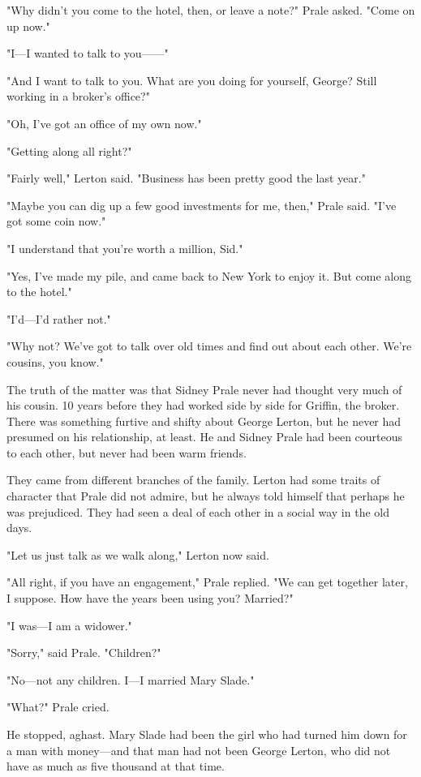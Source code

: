 \documentclass{novel}
\begin{document}
"Why didn't you come to the hotel, then, or leave a note?" Prale asked. "Come on up now."

"I---I wanted to talk to you------"

"And I want to talk to you. What are you doing for yourself, George? Still working in a broker's office?"

"Oh, I've got an office of my own now."

"Getting along all right?"

"Fairly well," Lerton said. "Business has been pretty good the last year."

"Maybe you can dig up a few good investments for me, then," Prale said. "I've got some coin now."

"I understand that you're worth a million, Sid."

"Yes, I've made my pile, and came back to New York to enjoy it. But come along to the hotel."

"I'd---I'd rather not."

"Why not? We've got to talk over old times and find out about each other. We're cousins, you know."

The truth of the matter was that Sidney Prale never had thought very much of his cousin. 10 years before they had worked side by side for Griffin, the broker. There was something furtive and shifty about George Lerton, but he never had presumed on his relationship, at least. He and Sidney Prale had been courteous to each other, but never had been warm friends.

They came from different branches of the family. Lerton had some traits of character that Prale did not admire, but he always told himself that perhaps he was prejudiced. They had seen a deal of each other in a social way in the old days.

"Let us just talk as we walk along," Lerton now said.

"All right, if you have an engagement," Prale replied. "We can get together later, I suppose. How have the years been using you? Married?"

"I was---I am a widower."

"Sorry," said Prale. "Children?"

"No---not any children. I---I married Mary Slade."

"What?" Prale cried.

He stopped, aghast. Mary Slade had been the girl who had turned him down for a man with money---and that man had not been George Lerton, who did not have as much as five thousand at that time.
\end{document}
